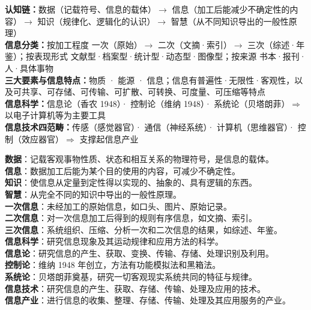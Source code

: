\documentclass[a4paper,11pt]{article}
\begin{document}

\begin{knowmap}
\textbf{认知链：}数据（记载符号、信息的载体）$\rightarrow$ 信息（加工后能减少不确定性的内容）$\rightarrow$ 知识（规律化、逻辑化的认识）$\rightarrow$ 智慧（从不同知识导出的一般性原理）\\[2pt]
\textbf{信息分类：}按加工程度 一次（原始）$\rightarrow$ 二次（文摘·索引）$\rightarrow$ 三次（综述·年鉴）；按表现形式 文献型·档案型·统计型·动态型·图像型；按来源 书本·报刊·人·具体事物\\[2pt]
\textbf{三大要素与信息特点：}物质 · 能源 · 信息；信息有普遍性·无限性·客观性，以及可共享、可存储、可传输、可扩散、可转换、可度量、可压缩等特点\\[2pt]
\textbf{信息科学：}信息论（香农 1948）· 控制论（维纳 1948）· 系统论（贝塔朗菲）$\Rightarrow$ 以电子计算机等为主要工具\\[2pt]
\textbf{信息技术四范畴：}传感（感觉器官）· 通信（神经系统）· 计算机（思维器官）· 控制（效应器官）$\Rightarrow$ 支撑起信息产业
\end{knowmap}

\begin{keyterms}
\textbf{数据}：记载客观事物性质、状态和相互关系的物理符号，是信息的载体。\\
\textbf{信息}：数据加工后能为某个目的使用的内容，可减少不确定性。\\
\textbf{知识}：使信息从定量到定性得以实现的、抽象的、具有逻辑的东西。\\
\textbf{智慧}：从完全不同的知识中导出的一般性原理。\\
\textbf{一次信息}：未经加工的原始信息，如口头、图片、原始记录。\\
\textbf{二次信息}：对一次信息加工后得到的规则有序信息，如文摘、索引。\\
\textbf{三次信息}：系统组织、压缩、分析一次和二次信息的结果，如综述、年鉴。\\
\textbf{信息科学}：研究信息现象及其运动规律和应用方法的科学。\\
\textbf{信息论}：研究信息的产生、获取、变换、传输、存储、处理识别及利用。\\
\textbf{控制论}：维纳 1948 年创立，方法有功能模拟法和黑箱法。\\
\textbf{系统论}：贝塔朗菲奠基，研究一切客观现实系统共同的特征与规律。\\
\textbf{信息技术}：研究信息的产生、获取、存储、传输、处理及应用的技术。\\
\textbf{信息产业}：进行信息的收集、整理、存储、传输、处理及其应用服务的产业。
\end{keyterms}
\end{document}
